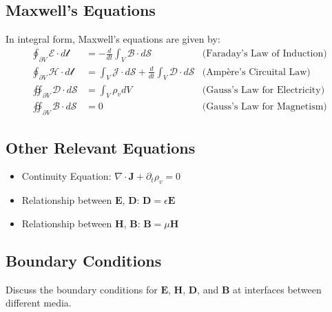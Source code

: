 \documentclass[12pt]{article}
\begin{document}
\subsection*{Maxwell's Equations}
In integral form, Maxwell's equations are given by:
\begin{align}
  \oint_{\partial V} \bm{\mathcal{E}} \cdot d\bm{\mathcal{l}} &= - \frac{d}{dt} \int_{V} \bm{\mathcal{B}} \cdot d\bm{\mathcal{S}} & \text{(Faraday's Law of Induction)} \\
  \oint_{\partial V} \bm{\mathcal{H}} \cdot d\bm{\mathcal{l}} &= \int_{V} \bm{\mathcal{J}} \cdot d\bm{\mathcal{S}} + \frac{d}{dt} \int_{V} \bm{\mathcal{D}} \cdot d\bm{\mathcal{S}} & \text{(Ampère's Circuital Law)} \\
  \oiint_{\partial V} \bm{\mathcal{D}} \cdot d\bm{\mathcal{S}} &= \int_{V} \rho_v dV & \text{(Gauss's Law for Electricity)} \\
  \oiint_{\partial V} \bm{\mathcal{B}} \cdot d\bm{\mathcal{S}} &= 0 & \text{(Gauss's Law for Magnetism)}
\end{align}

\subsection*{Other Relevant Equations}
\begin{itemize}
  \item Continuity Equation: $\nabla \cdot \mathbf{J} + \partial_t \rho_v = 0$
  \item Relationship between $\mathbf{E}$, $\mathbf{D}$: $\mathbf{D} = \epsilon \mathbf{E}$
  \item Relationship between $\mathbf{H}$, $\mathbf{B}$: $\mathbf{B} = \mu \mathbf{H}$
\end{itemize}

\subsection*{Boundary Conditions}
Discuss the boundary conditions for $\mathbf{E}$, $\mathbf{H}$, $\mathbf{D}$, and $\mathbf{B}$ at interfaces between different media.
\end{document}
